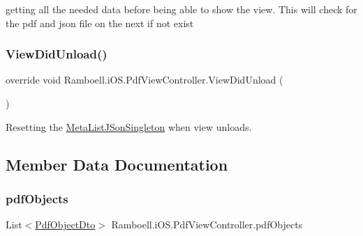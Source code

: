 getting all the needed data before being able to show the view. This will check for the pdf and json file on the next if not exist 

\mbox{\label{class_ramboell_1_1i_o_s_1_1_pdf_view_controller_a203e0e87fd40da6f90ffbe9ffe96c65f}} 
\subsubsection{\texorpdfstring{View\+Did\+Unload()}{ViewDidUnload()}}
{\footnotesize\ttfamily override void Ramboell.\+i\+O\+S.\+Pdf\+View\+Controller.\+View\+Did\+Unload (\begin{DoxyParamCaption}{ }\end{DoxyParamCaption})\hspace{0.3cm}{\ttfamily [inline]}}



Resetting the \hyperlink{class_ramboell_1_1i_o_s_1_1_meta_list_j_son_singleton}{Meta\+List\+J\+Son\+Singleton} when view unloads. 



\subsection{Member Data Documentation}
\mbox{\label{class_ramboell_1_1i_o_s_1_1_pdf_view_controller_ae92538214df4571ae24ccded6da10609}} 
\subsubsection{\texorpdfstring{pdf\+Objects}{pdfObjects}}
{\footnotesize\ttfamily List$<$\hyperlink{class_ramboell_1_1i_o_s_1_1_pdf_object_dto}{Pdf\+Object\+Dto}$>$ Ramboell.\+i\+O\+S.\+Pdf\+View\+Controller.\+pdf\+Objects\hspace{0.3cm}{\ttfamily [private]}}



